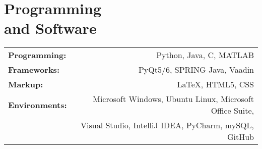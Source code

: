 \section{\sc Programming\\ and Software}
\begin{tabular}{lr}
	\textbf{Programming:} & Python, Java, C, MATLAB\\
	\textbf{Frameworks:} & PyQt5/6, SPRING Java, Vaadin\\
	\textbf{Markup:} & \LaTeX, HTML5, CSS\\
	\textbf{Environments:} & Microsoft Windows, Ubuntu Linux, Microsoft Office Suite,\\
	& Visual Studio, IntelliJ IDEA, PyCharm, mySQL, GitHub
\end{tabular}